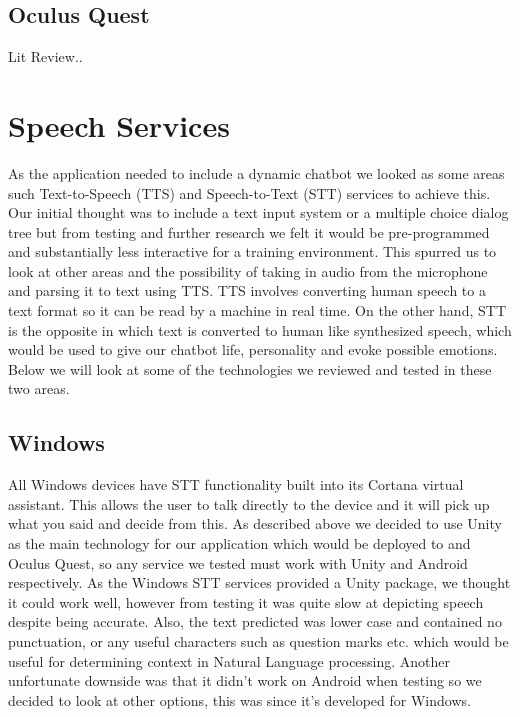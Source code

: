 \subsection{Oculus Quest}
Lit Review..

\section{Speech Services}
As the application needed to include a dynamic chatbot we looked as some areas such Text-to-Speech (TTS) and Speech-to-Text (STT) services to achieve this. Our initial thought was to include a text input system or a multiple choice dialog tree but from testing and further research we felt it would be pre-programmed and substantially less interactive for a training environment. This spurred us to look at other areas and the possibility of taking in audio from the microphone and parsing it to text using TTS. TTS involves converting human speech to a text format so it can be read by a machine in real time. On the other hand, STT is the opposite in which text is converted to human like synthesized speech, which would be used to give our chatbot life, personality and evoke possible emotions. Below we will look at some of the technologies we reviewed and tested in these two areas.

\subsection{Windows}
All Windows devices have STT functionality built into its Cortana virtual assistant. This allows the user to talk directly to the device and it will pick up what you said and decide from this. As described above we decided to use Unity as the main technology for our application which would be deployed to and Oculus Quest, so any service we tested must work with Unity and Android respectively. As the Windows STT services provided a Unity package, we thought it could work well, however from testing it was quite slow at depicting speech despite being accurate. Also, the text predicted was lower case and contained no punctuation, or any useful characters such as question marks etc. which would be useful for determining context in Natural Language processing. Another unfortunate downside was that it didn't work on Android when testing so we decided to look at other options, this was since it's developed for Windows. 

